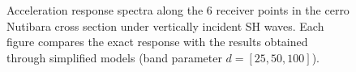 \documentclass[11pt,letterpaper]{article}
\begin{document}
\begin{figure}[H]
	\center
	\caption{\small Acceleration response spectra along the 6 receiver points in the cerro Nutibara cross section under vertically incident SH waves. Each figure compares the exact response with the results obtained through simplified models (band parameter $d = [25 , 50 , 100]$).}
 \label{fig:SaptosNutEWSH}
\end{figure}
\end{document}

